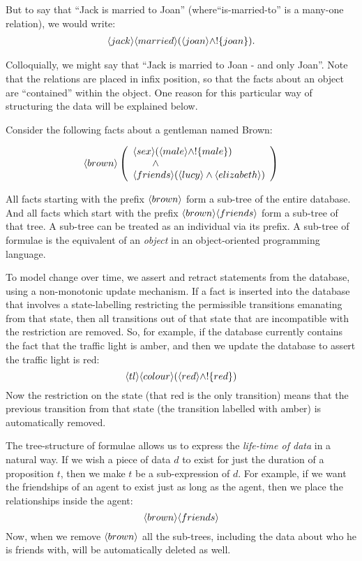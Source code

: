 \NI But to say that ``Jack is married to Joan''
(where``is-married-to'' is a many-one relation), we would write:
\begin{eqnarray*}
  \langle jack \rangle \langle married \rangle (\langle joan \rangle \land ! \{joan\}).
\end{eqnarray*}

\NI Colloquially, we might say that ``Jack is married to Joan - and
only Joan''.  Note that the relations are placed in infix position, so
that the facts about an object are ``contained'' within the object.
One reason for this particular way of structuring the data will be
explained below.
 
Consider the following facts about a gentleman named Brown:

\[
   \langle brown \rangle \left(
   \begin{array}{l}
     \langle sex \rangle (\langle male \rangle \land ! \{male\}) \\
        \qquad \land \\
     \langle friends \rangle (\langle lucy \rangle \land \langle elizabeth \rangle ) 
   \end{array}
   \right)
\]

\NI All facts  starting with the prefix $\MAY{brown}$ form a
sub-tree of the entire database.  And all  facts which start with
the prefix $\MAY{brown} \MAY{friends}$ form a sub-tree of that tree.
A sub-tree can be treated as an individual via its prefix.  
A sub-tree of formulae is the \cathoristic{} equivalent of an
\emph{object} in an object-oriented programming language.

To model change over time, we assert and retract statements from the
database, using a non-monotonic update mechanism.  If a fact is
inserted into the database that involves a state-labelling restricting
the permissible  transitions emanating from that state, then all
transitions out of that state that are incompatible with the
restriction are removed.  So, for example, if the database currently
contains the fact that the traffic light is amber, and then we update
the database to assert the traffic light is red:
\[
\langle tl \rangle \langle colour \rangle (\langle red \rangle \land !\{red\})
\]
Now the restriction on the state (that red is the only transition)
means that the previous transition from that state (the transition
labelled with amber) is automatically removed.

The tree-structure of formulae allows us to express the \emph{life-time of data} in a natural way. 
If we wish a piece of data $d$ to exist for just the duration of a proposition $t$, then we make $t$ be a sub-expression of $d$. 
For example, if we want the friendships of an agent to exist just as long as the agent, then we place the relationships inside the agent: 
\[
\langle brown \rangle \langle friends \rangle \]
Now, when we remove $\MAY{brown}$ all the sub-trees, including the data about who he is friends with, will be automatically deleted as well.

